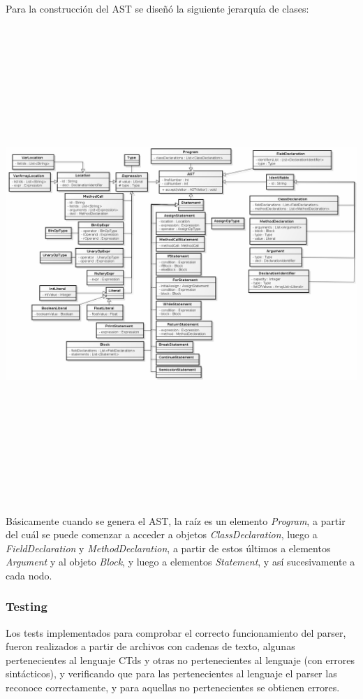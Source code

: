 \documentclass[11pt,a4paper]{article}
\begin{document}
Para la construcción del AST se diseñó la siguiente jerarquía de clases:
\\
\begin{flushleft}
	\includegraphics[width=19.6cm,height=18cm]{ASTDiagram.png}
\end{flushleft}

Básicamente cuando se genera el AST, la raíz es un elemento \textit{Program}, a partir del cuál se puede comenzar a acceder a objetos \textit{ClassDeclaration}, luego a \textit{FieldDeclaration} y \textit{MethodDeclaration}, a partir de estos últimos a elementos \textit{Argument} y al objeto \textit{Block}, y luego a elementos \textit{Statement}, y así sucesivamente a cada nodo.

\subsubsection{Testing}

Los tests implementados para comprobar el correcto funcionamiento del parser, fueron realizados a partir de archivos con cadenas de texto, algunas pertenecientes al lenguaje CTds y otras no pertenecientes al lenguaje (con errores sintácticos), y verificando que para las pertenecientes al lenguaje el parser las reconoce correctamente, y para aquellas no pertenecientes se obtienen errores. 
\end{document}
